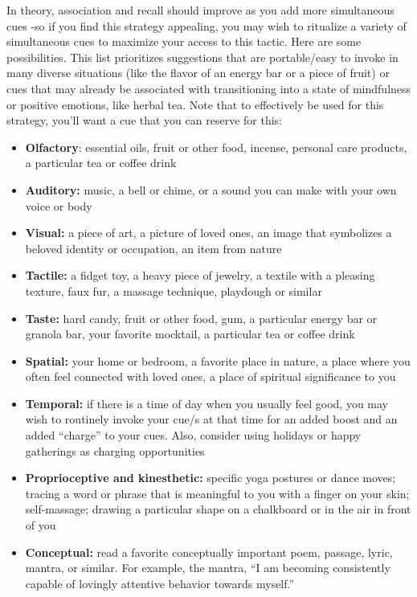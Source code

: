 \documentclass[12pt,letterpaper]{article}
\begin{document}
In theory, association and recall should improve as you add more simultaneous cues -so if you find this strategy appealing, you may wish to ritualize a variety of simultaneous cues to maximize your access to this tactic. Here are some possibilities. This list prioritizes suggestions that are portable/easy to invoke in many diverse situations (like the flavor of an energy bar or a piece of fruit) or cues that may already be associated with transitioning into a state of mindfulness or positive emotions, like herbal tea. Note that to effectively be used for this strategy, you'll want a cue that you can reserve for this:
\begin{itemize}
    \item \textbf{Olfactory}: essential oils, fruit or other food, incense, personal care products, a particular tea or coffee drink
    \item \textbf{Auditory:} music, a bell or chime, or a sound you can make with your own voice or body 
    \item \textbf{Visual:} a piece of art, a picture of loved ones, an image that symbolizes a beloved identity or occupation, an item from nature
    \item \textbf{Tactile:} a fidget toy, a heavy piece of jewelry, a textile with a pleasing texture, faux fur, a massage technique, playdough or similar
    \item \textbf{Taste:} hard candy, fruit or other food, gum, a particular energy bar or granola bar, your favorite mocktail, a particular tea or coffee drink
    \item \textbf{Spatial:} your home or bedroom, a favorite place in nature, a place where you often feel connected with loved ones, a place of spiritual significance to you
    \item \textbf{Temporal:} if there is a time of day when you usually feel good, you may wish to routinely invoke your cue/s at that time for an added boost and an added “charge” to your cues. Also, consider using holidays or happy gatherings as charging opportunities
    \item \textbf{Proprioceptive and kinesthetic:} specific yoga postures or dance moves; tracing a word or phrase that is meaningful to you with a finger on your skin; self-massage; drawing a particular shape on a chalkboard or in the air in front of you
    \item \textbf{Conceptual:} read a favorite conceptually important poem, passage, lyric, mantra, or similar. For example, the mantra, “I am becoming consistently capable of lovingly attentive behavior towards myself.”
\end{itemize}
\end{document}
